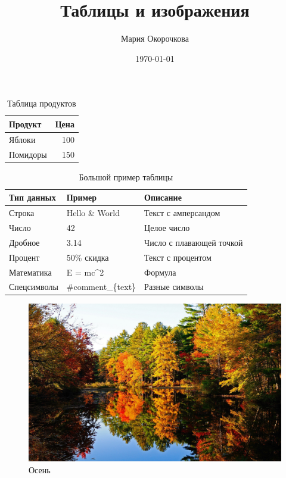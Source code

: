 \documentclass{article}
\title{Таблицы и изображения}
\author{Мария Окорочкова}
\date{\today}
\begin{document}
\maketitle

\begin{table}[htbp]
\centering
\begin{tabular}{l r}
\hline
Продукт & Цена \\
\hline
Яблоки & 100 \\
Помидоры & 150 \\
\hline
\end{tabular}
\caption{Таблица продуктов}
\label{tab:products}
\end{table}

\begin{table}[htbp]
\centering
\begin{tabular}{l l p{6cm}}
\hline
Тип данных & Пример & Описание \\
\hline
Строка & Hello \& World & Текст с амперсандом \\
Число & 42 & Целое число \\
Дробное & 3.14 & Число с плавающей точкой \\
Процент & 50\% скидка & Текст с процентом \\
Математика & E = mc\textasciicircum{}2 & Формула \\
Спецсимволы & \#comment\_\{text\} & Разные символы \\
\hline
\end{tabular}
\caption{Большой пример таблицы}
\label{tab:complex_data}
\end{table}

\begin{figure}[htbp]
\centering
\includegraphics[width=1.0\textwidth]{image.png}
\caption{Осень}
\label{fig:example}
\end{figure}
\end{document}
